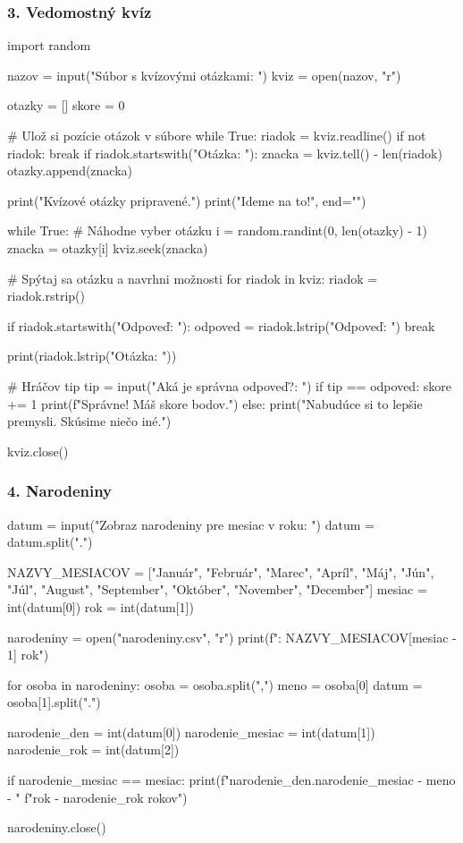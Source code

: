 \subsubsection*{3. Vedomostný kvíz}
\begin{solution}
import random

nazov = input("Súbor s kvízovými otázkami: ")
kviz = open(nazov, "r")

otazky = []
skore = 0

# Ulož si pozície otázok v súbore
while True:
    riadok = kviz.readline()
    if not riadok:
        break
    if riadok.startswith("Otázka: "):
        znacka = kviz.tell() - len(riadok)
        otazky.append(znacka)

print("Kvízové otázky pripravené.")
print("Ideme na to!", end="\n\n")

while True:
    # Náhodne vyber otázku
    i = random.randint(0, len(otazky) - 1)
    znacka = otazky[i]
    kviz.seek(znacka)

    # Spýtaj sa otázku a navrhni možnosti
    for riadok in kviz:
        riadok = riadok.rstrip()

        if riadok.startswith("Odpoveď: "):
            odpoved = riadok.lstrip("Odpoveď: ")
            break

        print(riadok.lstrip("Otázka: "))

    # Hráčov tip
    tip = input("Aká je správna odpoveď?: ")
    if tip == odpoved:
        skore += 1
        print(f"Správne! Máš {skore} bodov.\n")
    else:
        print("Nabudúce si to lepšie premysli. Skúsime niečo iné.\n")

kviz.close()
\end{solution}


\subsubsection*{4. Narodeniny}
\begin{solution}
datum = input("Zobraz narodeniny pre mesiac v roku: ")
datum = datum.split(".")

NAZVY_MESIACOV = ["Január", "Február", "Marec", "Apríl", "Máj", "Jún", "Júl",
                  "August", "September", "Október", "November", "December"]
mesiac = int(datum[0])
rok = int(datum[1])

narodeniny = open("narodeniny.csv", "r")
print(f"\nNarodeniny: {NAZVY_MESIACOV[mesiac - 1]} {rok}")

for osoba in narodeniny:
    osoba = osoba.split(",")
    meno = osoba[0]
    datum = osoba[1].split(".")

    narodenie_den = int(datum[0])
    narodenie_mesiac = int(datum[1])
    narodenie_rok = int(datum[2])

    if narodenie_mesiac == mesiac:
        print(f"{narodenie_den}.{narodenie_mesiac} - {meno} - "
              f"{rok - narodenie_rok} rokov")

narodeniny.close()
\end{solution}

